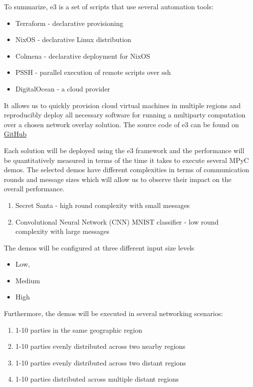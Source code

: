 To summarize, \gls{e3} is a set of scripts that use several automation
tools:

\begin{itemize}
\tightlist
\item
  Terraform - declarative provisioning
\item
  NixOS - declarative Linux distribution
\item
  Colmena - declarative deployment for NixOS
\item
  PSSH - parallel execution of remote scripts over ssh
\item
  DigitalOcean - a cloud provider
\end{itemize}

It allows us to quickly provision cloud virtual machines in multiple
regions and reproducibly deploy all necessary software for running a
multiparty computation over a chosen network overlay solution. The
source code of \gls{e3} can be found on
\href{https://github.com/e-nikolov/mpyc}{GitHub}

Each solution will be deployed using the \gls{e3} framework and the
performance will be quantitatively measured in terms of the time it
takes to execute several MPyC demos. The selected demos have different
complexities in terms of communication rounds and message sizes which
will allow us to observe their impact on the overall performance.

\begin{enumerate}
\def\labelenumi{\arabic{enumi}.}
\tightlist
\item
  Secret Santa - high round complexity with small messages
\item
  Convolutional Neural Network (CNN) MNIST classifier - low round
  complexity with large messages
\end{enumerate}

The demos will be configured at three different input size levels

\begin{itemize}
\tightlist
\item
  Low,
\item
  Medium
\item
  High
\end{itemize}

Furthermore, the demos will be executed in several networking scenarios:

\begin{enumerate}
\def\labelenumi{\arabic{enumi}.}
\tightlist
\item
  1-10 parties in the same geographic region
\item
  1-10 parties evenly distributed across two nearby regions
\item
  1-10 parties evenly distributed across two distant regions
\item
  1-10 parties distributed across multiple distant regions
\end{enumerate}

